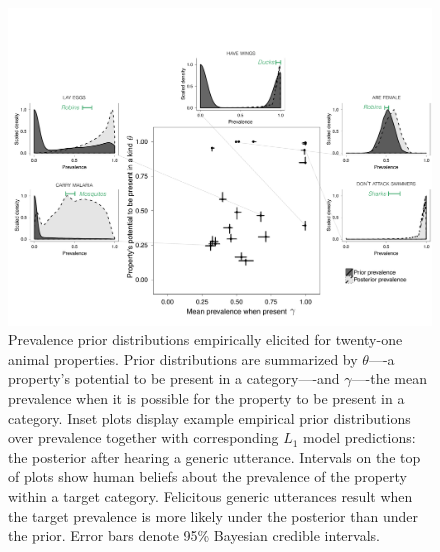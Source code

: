 \documentclass{pnastwo}
\begin{document}
\begin{article}
\begin{figure}
\centering
    \includegraphics[width=\columnwidth]{prevalence-scatter-wDists2.pdf}
    \caption{Prevalence prior distributions empirically elicited for twenty-one animal properties.
    Prior distributions are summarized by $\theta$----a property's potential to be present in a category----and $\gamma$----the mean prevalence when it is possible for the property to be present in a category.
    Inset plots display example empirical prior distributions over prevalence together with corresponding $L_1$ model predictions: the posterior after hearing a generic utterance. 
    Intervals on the top of plots show human beliefs about the prevalence of the property within a target category.
    Felicitous generic utterances result when the target prevalence is more likely under the posterior than under the prior.
     Error bars denote 95\% Bayesian credible intervals.
    }
  \label{fig:priors1a}
\end{figure}




\end{article}
\end{document}
